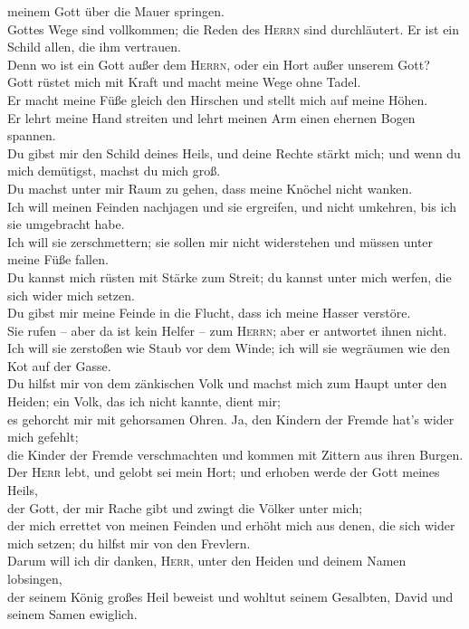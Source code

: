 meinem Gott über die Mauer springen.\\
 Gottes Wege sind vollkommen; die Reden des
\textsc{Herrn} sind durchläutert. Er ist ein Schild allen, die ihm
vertrauen.\\
 Denn wo ist ein Gott außer dem \textsc{Herrn}, oder ein
Hort außer unserem Gott?\\
 Gott rüstet mich mit Kraft und macht meine Wege ohne
Tadel.\\
 Er macht meine Füße gleich den Hirschen und stellt mich
auf meine Höhen.\\
 Er lehrt meine Hand streiten und lehrt meinen Arm einen
ehernen Bogen spannen.\\
 Du gibst mir den Schild deines Heils, und deine Rechte
stärkt mich; und wenn du mich demütigst, machst du mich groß.\\
 Du machst unter mir Raum zu gehen, dass meine Knöchel
nicht wanken.\\
 Ich will meinen Feinden nachjagen und sie ergreifen, und
nicht umkehren, bis ich sie umgebracht habe.\\
 Ich will sie zerschmettern; sie sollen mir nicht
widerstehen und müssen unter meine Füße fallen.\\
 Du kannst mich rüsten mit Stärke zum Streit; du kannst
unter mich werfen, die sich wider mich setzen.\\
 Du gibst mir meine Feinde in die Flucht, dass ich meine
Hasser verstöre.\\
 Sie rufen -- aber da ist kein Helfer -- zum
\textsc{Herrn}; aber er antwortet ihnen nicht.\\
 Ich will sie zerstoßen wie Staub vor dem Winde; ich will
sie wegräumen wie den Kot auf der Gasse.\\
 Du hilfst mir von dem zänkischen Volk und machst mich
zum Haupt unter den Heiden; ein Volk, das ich nicht kannte, dient mir;\\
 es gehorcht mir mit gehorsamen Ohren. Ja, den Kindern
der Fremde hat's wider mich gefehlt;\\
 die Kinder der Fremde verschmachten und kommen mit
Zittern aus ihren Burgen.\\
 Der \textsc{Herr} lebt, und gelobt sei mein Hort; und
erhoben werde der Gott meines Heils,\\
 der Gott, der mir Rache gibt und zwingt die Völker unter
mich;\\
 der mich errettet von meinen Feinden und erhöht mich aus
denen, die sich wider mich setzen; du hilfst mir von den Frevlern.\\
 Darum will ich dir danken, \textsc{Herr}, unter den
Heiden und deinem Namen lobsingen,\\
 der seinem König großes Heil beweist und wohltut seinem
Gesalbten, David und seinem Samen ewiglich.

